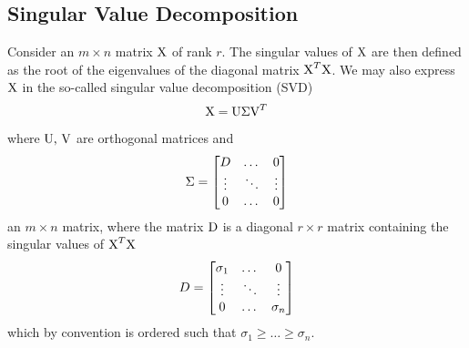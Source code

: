 \documentclass[reprint, english, nofootinbib]{revtex4-2}
\begin{document}
    \subsection{Singular Value Decomposition}
        \noindent
        Consider an $m\times n$ matrix $\textup X$ of rank $r$. The singular values of $\textup X$ are then defined as the root of the eigenvalues of the diagonal matrix $\textup X^T\textup X$. We may also express $\textup X$ in the so-called singular value decomposition (SVD)
        \begin{equation}
            \textup X = \textup{U}\Sigma\textup{V}^T
        \end{equation}
        where $\textup{U, V}$ are orthogonal matrices and
        \begin{equation}
            \Sigma =
            \qty[
            \begin{matrix}
                D & \dots & 0 \\
                \vdots & \ddots & \vdots \\
                0 & \dots & 0
            \end{matrix}
            ]
        \end{equation}
        an $m\times n$ matrix, where the matrix $\textup D$ is a diagonal $r \times r$ matrix containing the singular values of $\textup X^T \textup X$
        \begin{equation}
            D = \qty[
            \begin{matrix}
                \sigma_1 & \dots & 0 \\
                \vdots & \ddots & \vdots \\
                0 & \dots & \sigma_n
            \end{matrix}
            ]
        \end{equation}
        which by convention is ordered such that $\sigma_1 \geq \dots \geq \sigma_n$.
\end{document}
